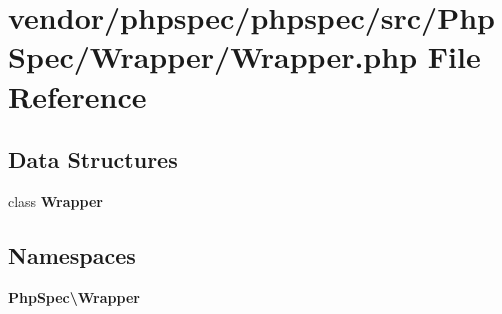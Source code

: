 \section{vendor/phpspec/phpspec/src/\+Php\+Spec/\+Wrapper/\+Wrapper.php File Reference}
\label{_wrapper_8php}
\subsection*{Data Structures}
\begin{DoxyCompactItemize}
\item 
class {\bf Wrapper}
\end{DoxyCompactItemize}
\subsection*{Namespaces}
\begin{DoxyCompactItemize}
\item 
 {\bf Php\+Spec\textbackslash{}\+Wrapper}
\end{DoxyCompactItemize}
